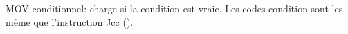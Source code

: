   \item[CMOVcc] MOV conditionnel: charge si la condition est vraie.
  Les codes condition sont les même que l'instruction Jcc
  ().
